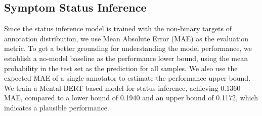 
\subsection{Symptom Status Inference}

Since the status inference model is trained with the non-binary targets of annotation distribution, we use Mean Absolute Error (MAE) as the evaluation metric. To get a better grounding for understanding the model performance, we establish a no-model baseline  as the performance lower bound, using the mean probability in the test set as the prediction for all samples. We also use the expected MAE of a single annotator to estimate the performance upper bound. We train a Mental-BERT based model for status inference, achieving 0.1360 MAE, compared to a lower bound of 0.1940 and an upper bound of 0.1172, which indicates a plausible performance.


